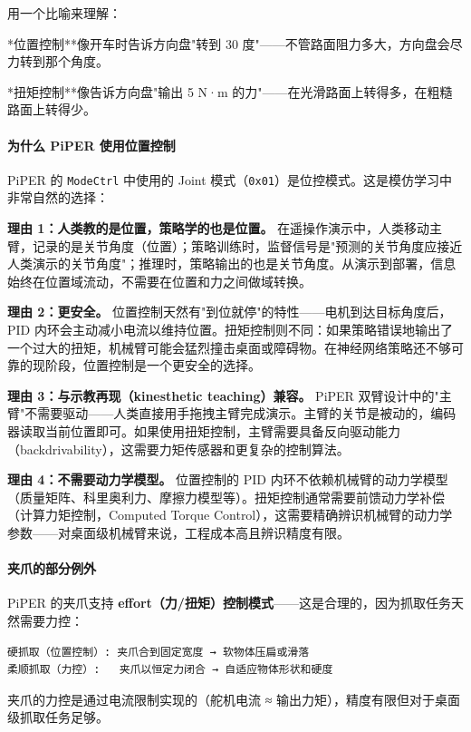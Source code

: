 \documentclass[UTF8,a4paper,11pt]{ctexart}
\begin{document}
用一个比喻来理解：
\item **位置控制**像开车时告诉方向盘"转到 30 度"——不管路面阻力多大，方向盘会尽力转到那个角度。
\item **扭矩控制**像告诉方向盘"输出 5 N·m 的力"——在光滑路面上转得多，在粗糙路面上转得少。

\paragraph{为什么 PiPER 使用位置控制}


PiPER 的 \texttt{ModeCtrl} 中使用的 Joint 模式（\texttt{0x01}）是位控模式。这是模仿学习中非常自然的选择：

\textbf{理由 1：人类教的是位置，策略学的也是位置。} 在遥操作演示中，人类移动主臂，记录的是关节角度（位置）；策略训练时，监督信号是"预测的关节角度应接近人类演示的关节角度"；推理时，策略输出的也是关节角度。从演示到部署，信息始终在位置域流动，不需要在位置和力之间做域转换。

\textbf{理由 2：更安全。} 位置控制天然有"到位就停"的特性——电机到达目标角度后，PID 内环会主动减小电流以维持位置。扭矩控制则不同：如果策略错误地输出了一个过大的扭矩，机械臂可能会猛烈撞击桌面或障碍物。在神经网络策略还不够可靠的现阶段，位置控制是一个更安全的选择。

\textbf{理由 3：与示教再现（kinesthetic teaching）兼容。} PiPER 双臂设计中的"主臂"不需要驱动——人类直接用手拖拽主臂完成演示。主臂的关节是被动的，编码器读取当前位置即可。如果使用扭矩控制，主臂需要具备反向驱动能力（backdrivability），这需要力矩传感器和更复杂的控制算法。

\textbf{理由 4：不需要动力学模型。} 位置控制的 PID 内环不依赖机械臂的动力学模型（质量矩阵、科里奥利力、摩擦力模型等）。扭矩控制通常需要前馈动力学补偿（计算力矩控制，Computed Torque Control），这需要精确辨识机械臂的动力学参数——对桌面级机械臂来说，工程成本高且辨识精度有限。

\paragraph{夹爪的部分例外}


PiPER 的夹爪支持 \textbf{effort（力/扭矩）控制模式}——这是合理的，因为抓取任务天然需要力控：

\begin{lstlisting}[language=text]
硬抓取（位置控制）: 夹爪合到固定宽度 → 软物体压扁或滑落
柔顺抓取（力控）:   夹爪以恒定力闭合 → 自适应物体形状和硬度
\end{lstlisting}

夹爪的力控是通过电流限制实现的（舵机电流 ≈ 输出力矩），精度有限但对于桌面级抓取任务足够。
\end{document}
